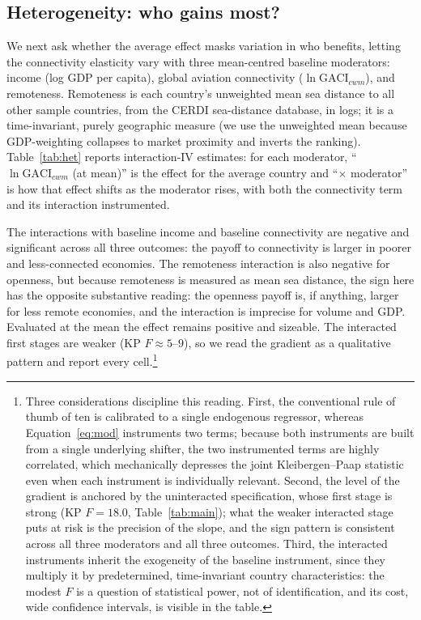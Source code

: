 \subsection{Heterogeneity: who gains most?}

We next ask whether the average effect masks variation in who benefits, letting
the connectivity elasticity vary with three mean-centred baseline moderators:
income (log GDP per capita), global aviation connectivity ($\ln\mathrm{GACI}_{cwm}$),
and remoteness. Remoteness is each country's unweighted mean sea distance to all
other sample countries, from the CERDI sea-distance database, in logs; it is a
time-invariant, purely geographic measure (we use the unweighted mean because
GDP-weighting collapses to market proximity and inverts the ranking).
Table~\ref{tab:het} reports interaction-IV estimates: for each moderator,
``$\ln\mathrm{GACI}_{cwm}$ (at mean)'' is the effect for the average country and
``$\times$ moderator'' is how that effect shifts as the moderator rises, with both
the connectivity term and its interaction instrumented.

The interactions with baseline income and baseline connectivity are negative and
significant across all three outcomes: the payoff to connectivity is larger in
poorer and less-connected economies. The remoteness interaction is also negative
for openness, but because remoteness is measured as mean sea distance, the sign
here has the opposite substantive reading: the openness payoff is, if anything,
larger for less remote economies, and the interaction is imprecise for volume
and GDP. Evaluated at the mean the effect remains positive and sizeable. The
interacted first stages are weaker (KP $F\approx5$--$9$), so we read the gradient
as a qualitative pattern and report every cell.\footnote{Three considerations
discipline this reading. First, the conventional rule of thumb of ten is
calibrated to a single endogenous regressor, whereas
Equation~\eqref{eq:mod} instruments two terms; because both instruments are
built from a single underlying shifter, the two instrumented terms are highly
correlated, which mechanically depresses the joint Kleibergen--Paap statistic
even when each instrument is individually relevant. Second, the level of the
gradient is anchored by the uninteracted specification, whose first stage is
strong (KP $F=18.0$, Table~\ref{tab:main}); what the weaker interacted stage
puts at risk is the precision of the slope, and the sign pattern is consistent
across all three moderators and all three outcomes. Third, the interacted
instruments inherit the exogeneity of the baseline instrument, since they
multiply it by predetermined, time-invariant country characteristics: the
modest $F$ is a question of statistical power, not of identification, and its
cost, wide confidence intervals, is visible in the table.}

